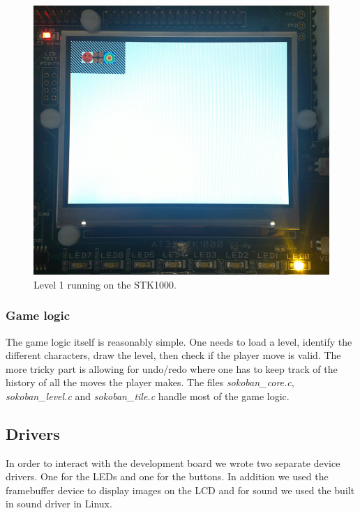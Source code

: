\documentclass[a4paper,11pt]{article}
\begin{document}
\begin{figure}[H]
\centering
\includegraphics[scale=0.5]{images/level1.png}
\caption{Level 1 running on the STK1000.}
\label{fig:level1}
\end{figure}

\subsubsection{Game logic}
The game logic itself is reasonably simple. One needs to load a level, identify the different characters, draw the level, then check if the player move is valid. The more tricky part is allowing for undo/redo where one has to keep track of the history of all the moves the player makes. The files \textit{sokoban\_core.c}, \textit{sokoban\_level.c} and \textit{sokoban\_tile.c} handle most of the game logic.

\subsection{Drivers}
\label{sec:driversandcontrollers}
In order to interact with the development board we wrote two separate device drivers. One for the LEDs and one for the buttons. In addition we used the framebuffer device to display images on the LCD and for sound we used the built in sound driver in Linux.
\end{document}
